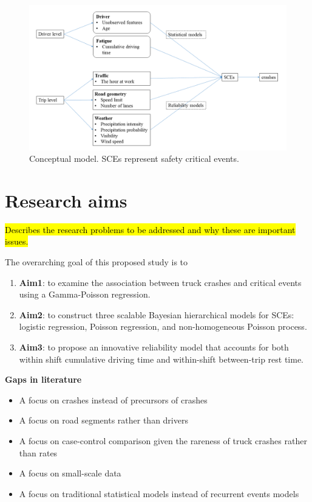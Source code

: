 \documentclass[12pt]{book}
\numberwithin{equation}{chapter}
\providecommand{\tightlist}{%
  \setlength{\itemsep}{0pt}\setlength{\parskip}{0pt}}
\begin{document}
\begin{figure}

{\centering \includegraphics[width=\linewidth]{figs/conceptual_model} 

}

\caption{Conceptual model. SCEs represent safety critical events.}\label{fig:conceptmodel}
\end{figure}

\hypertarget{research-aims}{%
\section{Research aims}\label{research-aims}}

\hl{Describes the research problems to be addressed and why these are important issues.}

The overarching goal of this proposed study is to

\begin{enumerate}
\def\labelenumi{\arabic{enumi}.}
\item
  \textbf{Aim1}: to examine the association between truck crashes and critical events using a Gamma-Poisson regression.
\item
  \textbf{Aim2}: to construct three scalable Bayesian hierarchical models for SCEs: logistic regression, Poisson regression, and non-homogeneous Poisson process.
\item
  \textbf{Aim3}: to propose an innovative reliability model that accounts for both within shift cumulative driving time and within-shift between-trip rest time.
\end{enumerate}

\textbf{Gaps in literature}

\begin{itemize}
\tightlist
\item
  A focus on crashes instead of precursors of crashes
\item
  A focus on road segments rather than drivers
\item
  A focus on case-control comparison given the rareness of truck crashes rather than rates
\item
  A focus on small-scale data
\item
  A focus on traditional statistical models instead of recurrent events models
\end{itemize}
\end{document}
